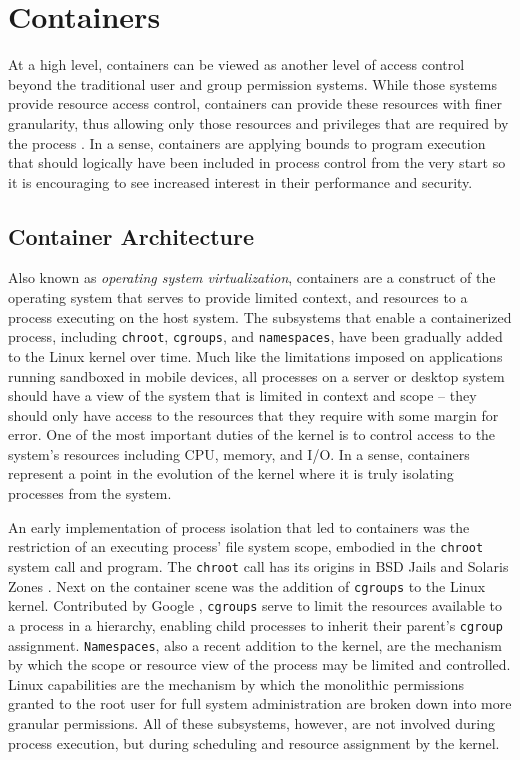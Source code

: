 \section{Containers}
\label{sec:containers}
At a high level, containers can be viewed as another level of access control beyond the traditional user and group permission systems. 
While those systems provide resource access control, containers can provide these resources with finer granularity, thus allowing only those resources and privileges that are required by the process \autocite{_felter_1}. 
In a sense, containers are applying bounds to program execution that should logically have been included in process control from the very start so it is encouraging to see increased interest in their performance and security.

\subsection{Container Architecture}
\label{sec:containerarchitecture}
Also known as \emph{operating system virtualization}, containers are a construct of the operating system that serves to provide limited context, and resources to a process executing on the host system. 
The subsystems that enable a containerized process, including \texttt{chroot}, \texttt{cgroups}, and \texttt{namespaces}, have been gradually added to the Linux kernel over time.
Much like the limitations imposed on applications running sandboxed in mobile devices, all processes on a server or desktop system should have a view of the system that is limited in context and scope -- they should only have access to the resources that they require with some margin for error.  
One of the most important duties of the kernel is to control access to the system's resources including CPU, memory, and I/O.  
In a sense, containers represent a point in the evolution of the kernel where it is truly isolating processes from the system. 

An early implementation of process isolation that led to containers was the restriction of an executing process' file system scope, embodied in the \texttt{chroot} system call and program. 
The \texttt{chroot} call has its origins in BSD Jails and Solaris Zones \autocite{_zones_1}.
Next on the container scene was the addition of \texttt{cgroups} to the Linux kernel.  Contributed by Google \autocite{googlecgroups}, \texttt{cgroups} serve to limit the resources available to a process in a hierarchy, enabling child processes to inherit their parent's \texttt{cgroup} assignment. 
\texttt{Namespaces}, also a recent addition to the kernel, are the mechanism by which the scope or resource view of the process may be limited and controlled.
Linux capabilities are the mechanism by which the monolithic permissions granted to the root user for full system administration are broken down into more granular permissions.  
All of these subsystems, however, are not involved during process execution, but during scheduling and resource assignment by the kernel.  

